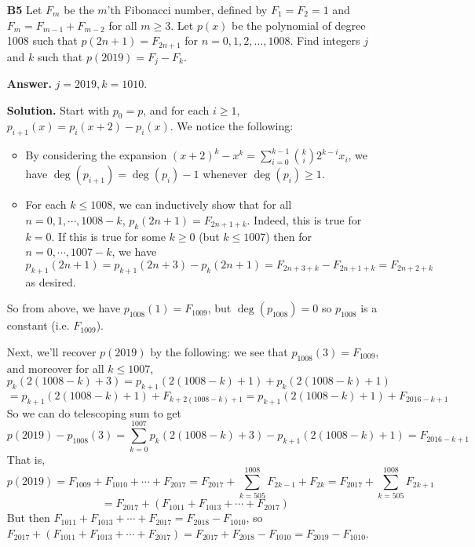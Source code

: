 \documentclass[11pt,a4paper]{article}
\newcommand{\<}{\langle}
\renewcommand{\>}{\rangle}
\begin{document}
\begin{enumerate}
	\item [\textbf{B5}] Let $F_m$ be the $m$'th Fibonacci number, defined by $F_1=F_2=1$ and $F_m = F_{m-1}+F_{m-2}$ for all $m \geq 3$. Let $p(x)$ be the polynomial of degree 1008 such that $p(2n+1)=F_{2n+1}$ for $n=0,1,2,\ldots,1008$. Find integers $j$ and $k$ such that $p(2019) = F_j - F_k$.
	
	\textbf{Answer.} $j=2019, k=1010$. 
	
	\textbf{Solution.}
	Start with $p_0=p$, and for each $i\ge 1$, $p_{i+1}(x)=p_{i}(x+2)-p_{i}(x)$. 
	We notice the following: 
	\begin{itemize}
		\item By considering the expansion $(x+2)^k-x^k = \sum_{i=0}^{k-1} \binom{k}{i}2^{k-i}x_i$, we have $\deg(p_{i+1})=\deg(p_i)-1$ whenever $\deg(p_i)\ge 1$. 
		
		\item For each $k\le 1008$, we can inductively show that for all $n=0, 1, \cdots, 1008-k$, 
		$p_k(2n+1)=F_{2n+1+k}$. 
		Indeed, this is true for $k=0$. 
		If this is true for some $k\ge 0$ (but $k\le 1007$) 
		then for $n=0, \cdots, 1007-k$, we have 
		\[
		p_{k+1}(2n+1)=p_{k+1}(2n+3)-p_{k}(2n+1)
		=F_{2n+3+k}-F_{2n+1+k}
		=F_{2n+2+k}
		\]
		as desired. 
	\end{itemize}
	So from above, we have $p_{1008}(1)=F_{1009}$, but $\deg(p_{1008})=0$ so $p_{1008}$ is a constant (i.e. $F_{1009}$). 
	
	Next, we'll recover $p(2019)$ by the following: we see that $p_{1008}(3)=F_{1009}$, and moreover for all $k\le 1007$, 
	\[
	p_k(2(1008-k)+3) = p_{k+1}(2(1008-k)+1)+p_k(2(1008-k)+1)
	\]\[
	=p_{k+1}(2(1008-k)+1)+F_{k+2(1008-k)+1}
	=p_{k+1}(2(1008-k)+1)+F_{2016-k+1}
	\]
	So we can do telescoping sum to get 
	\[
	p(2019)-p_{1008}(3)
	=\sum_{k=0}^{1007} p_k(2(1008-k)+3)-p_{k+1}(2(1008-k)+1)
	=F_{2016-k+1}
	\]
	That is, 
	\[
	p(2019)=F_{1009}+F_{1010}+\cdots + F_{2017}
	=F_{2017}+\sum_{k=505}^{1008}F_{2k-1}+F_{2k}
	=F_{2017}+\sum_{k=505}^{1008}F_{2k+1}
	\]\[
	=F_{2017}+(F_{1011}+F_{1013}+\cdots + F_{2017})
	\]
	But then $F_{1011}+F_{1013}+\cdots + F_{2017}=F_{2018}-F_{1010}$, so 
	$F_{2017}+(F_{1011}+F_{1013}+\cdots + F_{2017})=F_{2017}+F_{2018}-F_{1010}=F_{2019}-F_{1010}$. 
	
\end{enumerate}
\end{document}
